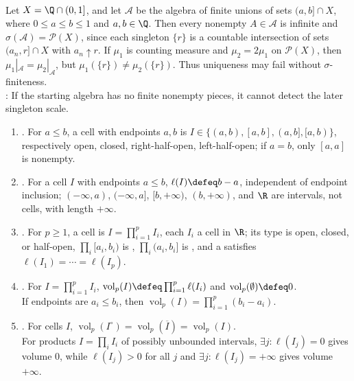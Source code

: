 \begin{example} \label{ex:rational-half-open-algebra-sigma-finiteness-necessary} \\
Let $X=\Q\cap(0,1]$, and let $\mathcal{A}$ be the algebra of finite unions of sets $(a,b]\cap X$, where $0\leq a\leq b\leq1$ and $a,b\in\Q$. Then every nonempty $A\in\mathcal{A}$ is infinite and $\sigma(\mathcal{A})=\mathcal{P}(X)$, since each singleton $\{r\}$ is a countable intersection of sets $(a_n,r]\cap X$ with $a_n\uparrow r$. If $\mu_1$ is counting measure and $\mu_2=2\mu_1$ on $\mathcal{P}(X)$, then $\mu_1|_{\mathcal{A}}=\mu_2|_{\mathcal{A}}$, but $\mu_1(\{r\})\neq\mu_2(\{r\})$. Thus uniqueness may fail without $\sigma$-finiteness.\\
: If the starting algebra has no finite nonempty pieces, it cannot detect the later singleton scale.
\end{example}

\begin{definition} \label{def:measure-cells-intervals-volume-rp} 
\begin{enumerate}[label=(\roman*)]
\setlength{\itemsep}{0pt}
\item {}. For $a\leq b$, a cell with endpoints $a,b$ is $I\in\{(a,b),[a,b],(a,b],[a,b)\}$, respectively open, closed, right-half-open, left-half-open; if $a=b$, only $[a,a]$ is nonempty.
\item {}. For a cell $I$ with endpoints $a\leq b$, $\ell(I)\defeq b-a$, independent of endpoint inclusion; $(-\infty,a)$, $(-\infty,a]$, $[b,+\infty)$, $(b,+\infty)$, and $\R$ are intervals, not cells, with length $+\infty$.
\item {}. For $p\geq1$, a cell is $I=\prod_{i=1}^{p}I_i$, each $I_i$ a cell in $\R$; its type is open, closed, or half-open, $\prod_i[a_i,b_i)$ is , $\prod_i(a_i,b_i]$ is , and a  satisfies $\ell(I_1)=\cdots=\ell(I_p)$.
\item {}. For $I=\prod_{i=1}^{p}I_i$, $\operatorname{vol}_p(I)\defeq\prod_{i=1}^{p}\ell(I_i)$ and $\operatorname{vol}_p(\emptyset)\defeq0$.\\
If endpoints are $a_i\leq b_i$, then $\operatorname{vol}_p(I)=\prod_{i=1}^{p}(b_i-a_i)$.
\item {}. For cells $I$, $\operatorname{vol}_p(I^\circ)=\operatorname{vol}_p(\overline I)=\operatorname{vol}_p(I)$.\\
For products $I=\prod_iI_i$ of possibly unbounded intervals, $\exists j:\ell(I_j)=0$ gives volume $0$, while $\ell(I_j)>0$ for all $j$ and $\exists j:\ell(I_j)=+\infty$ gives volume $+\infty$.
\end{enumerate}
\end{definition}

